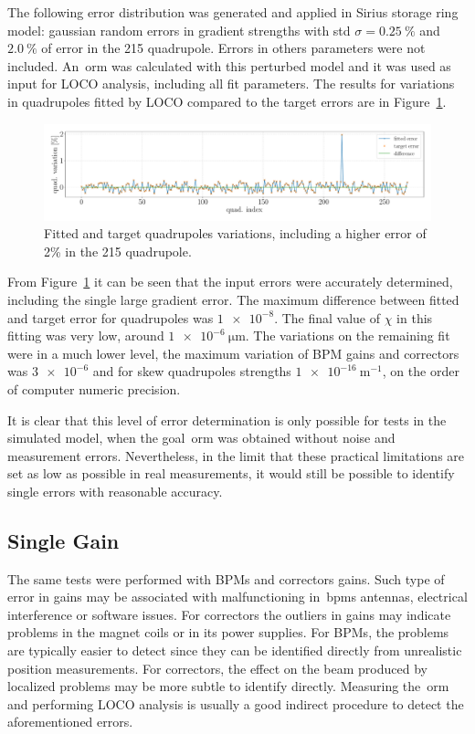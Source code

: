 The following error distribution was generated and applied in Sirius storage ring model: gaussian random errors in gradient strengths with std $\sigma=\SI{0.25}{\%}$ and $\SI{2.0}{\%}$ of error in the 215 quadrupole. Errors in others parameters were not included. An~\gls{orm} was calculated with this perturbed model and it was used as input for LOCO analysis, including all fit parameters. The results for variations in quadrupoles fitted by LOCO compared to the target errors are in Figure~\ref{fig:single_quad_detec}.
\begin{figure}[h!]
\centering
\includegraphics[width=1.0\textwidth]{figures/single_quaderror_detection_big.pdf}
\caption{Fitted and target quadrupoles variations, including a higher error of 2\% in the 215 quadrupole.}
\label{fig:single_quad_detec}
\end{figure}

From Figure~\ref{fig:single_quad_detec} it can be seen that the input errors were accurately determined, including the single large gradient error. The maximum difference between fitted and target error for quadrupoles was $\num{1e-8}$. The final value of $\chi$ in this fitting was very low, around $\SI{1e-6}{\micro\meter}$. The variations on the remaining fit were in a much lower level, the maximum variation of BPM gains and correctors was $\num{3e-6}$ and for skew quadrupoles strengths $\SI{1e-16}{\meter^{-1}}$, on the order of computer numeric precision.

It is clear that this level of error determination is only possible for tests in the simulated model, when the goal~\gls{orm} was obtained without noise and measurement errors. Nevertheless, in the limit that these practical limitations are set as low as possible in real measurements, it would still be possible to identify single errors with reasonable accuracy.
\subsection{Single Gain}
The same tests were performed with BPMs and correctors gains. Such type of error in gains may be associated with malfunctioning in~\glspl{bpm} antennas, electrical interference or software issues. For correctors the outliers in gains may indicate problems in the magnet coils or in its power supplies. For BPMs, the problems are typically easier to detect since they can be identified directly from unrealistic position measurements. For correctors, the effect on the beam produced by localized problems may be more subtle to identify directly. Measuring the~\gls{orm} and performing LOCO analysis is usually a good indirect procedure to detect the aforementioned errors.


